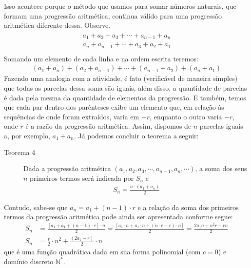 Isso acontece porque o método que usamos para somar números naturais, que formam uma progressão aritmética, continua válido para uma progressão aritmética diferente dessa. Observe.
\begin{align*}\!\begin{aligned}
a_{1}+a_{2}+a_{3}+ \cdots +a_{n-1}+a_{n}\\
a_{n}+a_{n-1}+ \cdots +a_{3}+a_{2}+a_{1}\\
\end{aligned}\end{align*}
Somando um elemento de cada linha e na ordem escrita teremos:
\begin{equation*}
\begin{split}(a_{1}+a_{n})+(a_{2}+a_{n-1})+ \cdots + (a_{n-1}+a_{2})+(a_{n}+a_{1})\end{split}
\end{equation*}
Fazendo uma analogia com a atividade, é fato (verificável de maneira simples) que todas as parcelas dessa soma são iguais, além disso, a quantidade de parcelas é dada pela mesma da quantidade de elementos da progressão. E também, temos que cada par dentro dos parênteses exibe um elemento que, em relação às sequências de onde foram extraídos, varia em \(+r\), enquanto o outro varia \(-r\), onde \(r\) é a razão da progressão aritmética. Assim, dispomos de \(n\) parcelas iguais a, por exemplo, \(a_{1}+a_{n}\). Já podemos concluir o teorema a seguir:

\begin{description}
\item[Teorema 4]

Dada a progressão aritmética \((a_{1},a_{2},a_{3}, \cdots ,a_{n-1},a_{n}, \cdots)\), a soma dos seus \(n\) primeiros termos será indicada por \(S_{n}\) e
\begin{equation*}
\begin{split}S_{n} = \frac{n \cdot (a_{1}+a_{n})}{2}\end{split}
\end{equation*}\end{description}

Contudo, sabe-se que \(a_{n}=a_{1}+(n-1)\cdot r\) e a relação da soma dos primeiros termos da progressão aritmética pode ainda ser apresentada conforme segue:
\begin{align*}
S_{n}&=\frac{[a_1+a_{1}+(n-1)\cdot r] \cdot n}{2}= \frac{[a_1 \cdot n +a_{1}  \cdot n + (n \cdot r-r)\cdot n]}{2}= \frac{2a_{1}n+n^2r-rn}{2}\\
S_{n}&=\frac{r}{2} \cdot n^2 + \frac{(2a_{1}-r)}{2} \cdot n
\end{align*}
que é uma função quadrática dada em sua forma polinomial (com \(c=0\)) e domínio discreto \(\mathbb{N}^*\).

